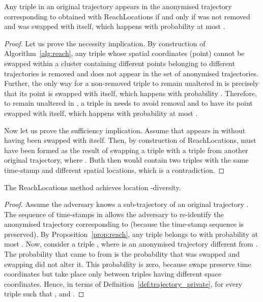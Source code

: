\begin{proposition} \label{prop:reach}
Any triple  in an original
trajectory 
appears in the anonymised trajectory
 corresponding to  obtained with ReachLocations
if and only if  was not removed and was swapped with itself,
which happens with probability at most .
\end{proposition}

\begin{proof}
Let us prove the necessity implication.
By construction of Algorithm~\ref{alg:reach},
any triple
 whose spatial coordinates (point)
cannot be swapped within a cluster
 containing  different points
belonging to  different trajectories
is removed and does not appear in the set of anonymised trajectories.
Further, the only way for a non-removed triple  to remain
unaltered in  is precisely that its point is swapped with itself,
which happens with probability .
Therefore, to remain unaltered in , a triple
in  needs to avoid removal and to have its point swapped with itself,
which happens with probability at most .

Now let us prove the sufficiency implication.
Assume that  appears
in  without having been swapped with itself.
Then, by construction
of ReachLocations,  must have been formed as the result
of swapping a triple  with a triple 
from another original trajectory, where .
Buth then  would contain two triples with the same time-stamp 
and different spatial locations, which is a contradiction. 
\end{proof}

\begin{theorem}
The ReachLocations method achieves location -diversity.
\end{theorem}

\begin{proof}
Assume the adversary knows a sub-trajectory
 of an original trajectory . The sequence of time-stamps
in  allows the adversary to re-identify the anonymised trajectory
 corresponding to  (because the time-stamp
sequence is preserved).
By Proposition~\ref{prop:reach}, any
triple  belongs
to  with probability at most .
Now, consider a triple ,
where  is an anonymised trajectory different
from .
The probability that  came to  from
 is the probability that  was
swapped and swapping did not alter it. This probability is zero,
because swaps preserve time coordinates
but take place only between triples having different
space coordinates.
Hence, in terms of Definition~\ref{def:trajectory_private},
 for every triple
 such that , 
and . 
\end{proof}

